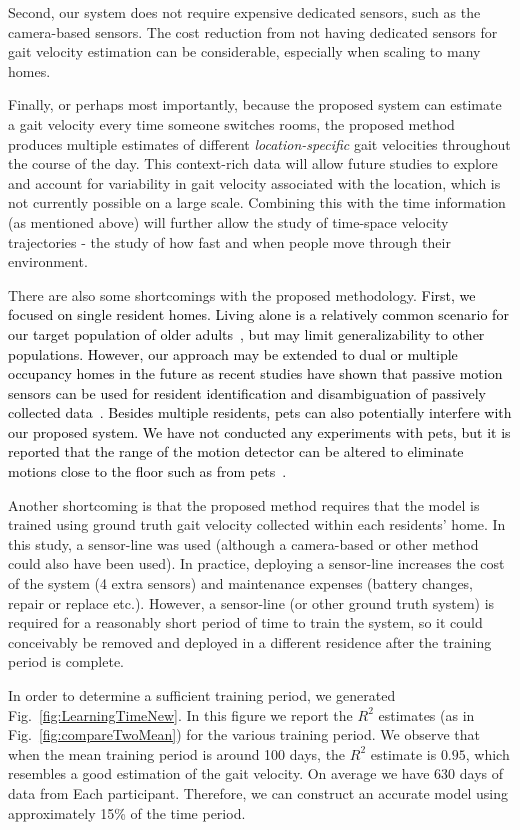\documentclass[journal]{IEEEtran}
\newcommand{\ca}[1]{\textcolor{black}{#1}}
\begin{document}
Second, our system does not require expensive dedicated sensors, such as the camera-based sensors. The cost reduction from not having dedicated sensors for gait velocity estimation can be considerable, especially when scaling to many homes.  


Finally, or perhaps most importantly, because the proposed system can estimate a gait velocity every time someone switches rooms, the proposed method produces multiple estimates of different {\it location-specific} gait velocities throughout the course of the day.  This context-rich data will allow future studies to explore and account for variability in gait velocity associated with the location, which is not currently possible on a large scale.  Combining this with the time information (as mentioned above) will further allow the study of time-space velocity trajectories - the study of how fast and when people move through their environment.

There are also some shortcomings with the proposed methodology.  \ca{First, we focused on single resident homes.  Living alone is a relatively common scenario for our target population of older adults~\cite{greenberg2011profile}, but may limit generalizability to other populations.  However, our approach may be extended to dual or multiple occupancy homes in the future as recent studies have shown that passive motion sensors can be used for resident identification and disambiguation of passively collected data~\cite{Banerjee2012,Austin2011}. Besides multiple residents, pets can also potentially interfere with our proposed system. We have not conducted any experiments with pets, but it is reported that the range of the motion detector can be altered to eliminate motions close to the floor such as from pets~\cite{caudle2004illumination}.}

Another shortcoming is that the proposed method requires that the model is trained using ground truth gait velocity collected within each residents' home.  In this study, a sensor-line was used (although a camera-based or other method could also have been used). In practice, deploying a sensor-line increases the cost of the system (4 extra sensors) and maintenance expenses (battery changes, repair or replace etc.). However, a sensor-line (or other ground truth system) is required for a reasonably short period of time to train the system, so it could conceivably be removed and deployed in a different residence after the training period is complete.  

In order to determine a sufficient training period, we generated Fig.~\ref{fig:LearningTimeNew}. In this figure we report the $R^2$ estimates (as in Fig.~\ref{fig:compareTwoMean}) for the various training period. We observe that when the mean training period is around 100 days, the $R^2$ estimate is $0.95$, which resembles a good estimation of the gait velocity. On average we have 630 days of data from Each participant. Therefore, we can construct an accurate model using approximately 15\% of the time period. 
\end{document}
